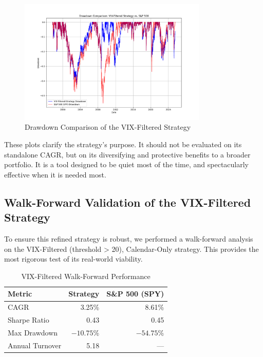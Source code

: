 \documentclass{article}
\begin{document}
\begin{figure}[htbp]
    \centering
    \includegraphics[width=0.8\textwidth]{plots/plot_vix_strategy_drawdowns.png}
    \caption{Drawdown Comparison of the VIX-Filtered Strategy}
    \label{fig:vix_drawdowns}
\end{figure}

These plots clarify the strategy's purpose. It should not be evaluated on its standalone CAGR, but on its diversifying and protective benefits to a broader portfolio. It is a tool designed to be quiet most of the time, and spectacularly effective when it is needed most.

\subsection{Walk-Forward Validation of the VIX-Filtered Strategy}
To ensure this refined strategy is robust, we performed a walk-forward analysis on the VIX-Filtered (threshold > 20), Calendar-Only strategy. This provides the most rigorous test of its real-world viability.

\begin{table}[htbp]
\centering
\caption{VIX-Filtered Walk-Forward Performance}
\begin{tabular}{lrr}
\toprule
\textbf{Metric} & \textbf{Strategy} & \textbf{S\&P 500 (SPY)} \\
\midrule
CAGR           & 3.25\%    & 8.61\%         \\
Sharpe Ratio   & 0.43      & 0.45           \\
Max Drawdown   & $-10.75$\% & $-54.75$\%      \\
Annual Turnover & 5.18      & ---            \\
\bottomrule
\end{tabular}
\end{table}
\end{document}
